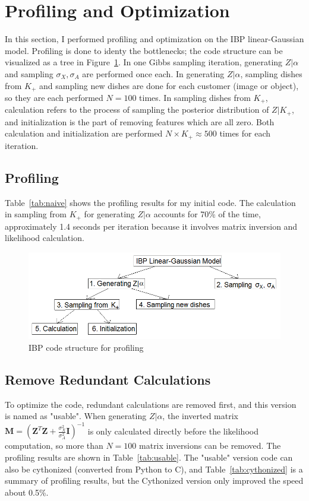 \section{Profiling and Optimization}
In this section, I performed profiling and optimization on the IBP linear-Gaussian model. Profiling is done to identy the bottlenecks; the code structure can be visualized as a tree in Figure~\ref{fig:profiling}. In one Gibbs sampling iteration, generating $Z|\alpha$ and sampling $\sigma_X,\sigma_A$ are performed once each. In generating $Z|\alpha$, sampling dishes from $K_+$ and sampling new dishes are done for each customer (image or object), so they are each performed $N=100$ times. In sampling dishes from $K_+$, calculation refers to the process of sampling the posterior distribution of $Z|K_+$, and initialization is the part of removing features which are all zero. Both calculation and initialization are performed $N\times K_+ \approx 500$ times for each iteration.

\subsection{Profiling}
Table~\ref{tab:naive} shows the profiling results for my initial code. The calculation in sampling from $K_+$ for generating $Z|\alpha$ accounts for 70\% of the time, approximately 1.4 seconds per iteration because it involves matrix inversion and likelihood calculation.

\begin{figure}[!ht]
\centering
    \includegraphics[width=\linewidth]{IBP_profiling.png}
    \caption{IBP code structure for profiling}
    \label{fig:profiling}
\end{figure}

\subsection{Remove Redundant Calculations}
\label{sub:usable}
To optimize the code, redundant calculations are removed first, and this version is named as "usable". When generating $Z|\alpha$, the inverted matrix $\mathbf{M} = (\mathbf{Z}^T\mathbf{Z}+\frac{\sigma_X^2}{\sigma_A^2}\mathbf{I})^{-1}$ is only calculated directly before the likelihood computation, so more than $N = 100$ matrix inversions can be removed. The profiling results are shown in Table~\ref{tab:usable}. The "usable" version code can also be cythonized (converted from Python to C), and Table~\ref{tab:cythonized} is a summary of profiling results, but the Cythonized version only improved the speed about 0.5\%.

